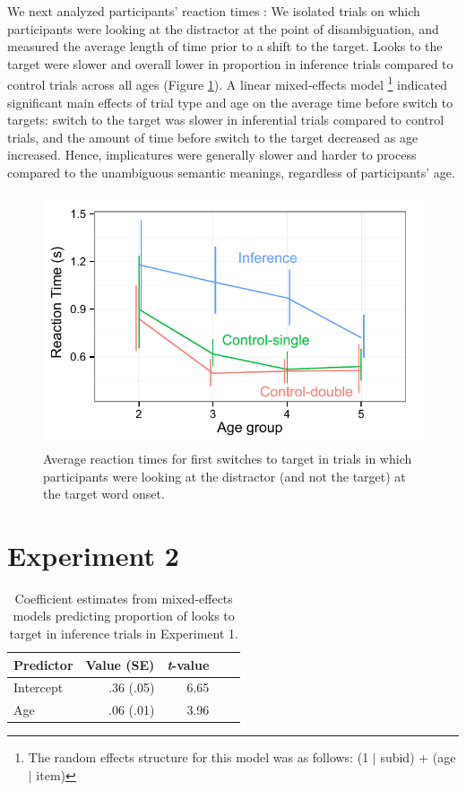 \documentclass[10pt,letterpaper]{article}
\begin{document}
We next analyzed participants' reaction times \cite{fernald2008looking}: We isolated trials on which participants were looking at the distractor at the point of disambiguation, and measured the average length of time prior to a shift to the target. Looks to the target were slower and overall lower in proportion in inference trials compared to control trials across all ages (Figure \ref{fig:rt}). A linear mixed-effects model \footnote{The random effects structure for this model was as follows: (1 $|$ subid) + (age $|$ item)} indicated significant main effects of trial type and age on the average time before switch to targets: switch to the target was slower in inferential trials compared to control trials, and the amount of time before switch to the target decreased as age increased. Hence, implicatures were generally slower and harder to process compared to the unambiguous semantic meanings, regardless of participants' age. 

\begin{figure}
\begin{centering} 
\includegraphics[width=3 in]{figures/expt1-rt.pdf}
\caption{\label{fig:rt} Average reaction times for first switches to target in trials in which participants were looking at the distractor (and not the target) at the target word onset.}
\end{centering} 
\end{figure}

\section{Experiment 2}

\begin{table}[b!]
\caption{\label{tab:lmer2}  Coefficient estimates from mixed-effects models predicting proportion of looks to target in inference trials in Experiment 1.} 
\begin{center} 
\begin{tabular}{l r r r l} 
\hline
Predictor  &  Value (SE) & \emph{t}-value\\
\hline
Intercept  & .36 (.05) & 6.65 \\
Age & .06 (.01) &  3.96 \\
\hline
\end{tabular} 
\end{center} 
\end{table}
\end{document}
